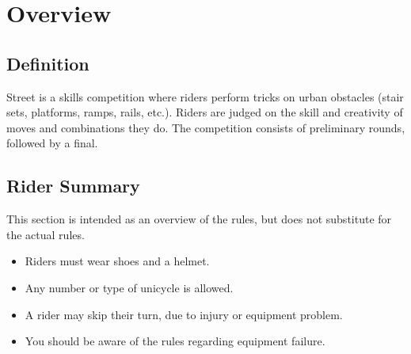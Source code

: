 \chapter{Overview}

\section{Definition}

Street is a skills competition where riders perform tricks on urban obstacles (stair sets, platforms, ramps, rails, etc.).
Riders are judged on the skill and creativity of moves and combinations they do.
The competition consists of preliminary rounds, followed by a final.

\section{Rider Summary}

This section is intended as an overview of the rules, but does not substitute for the actual rules.
\begin{itemize}
\item Riders must wear shoes and a helmet.
\item Any number or type of unicycle is allowed.
\item A rider may skip their turn, due to injury or equipment problem.
\item You should be aware of the rules regarding equipment failure.
\end{itemize}

